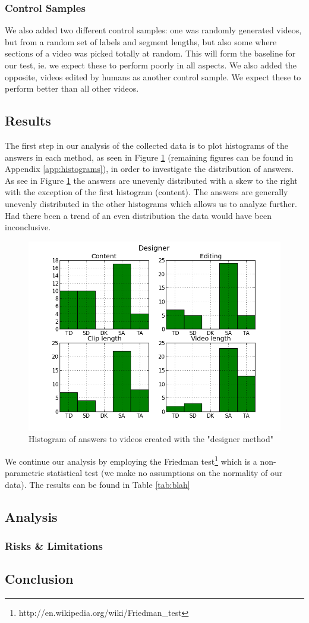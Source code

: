 \subsubsection{Control Samples}
%
We also added two different control samples: one was randomly generated videos, but from a random set of labels and segment lengths, but also some where sections of a video was picked totally at random.
%
%
This will form the baseline for our test, ie. we expect these to perform poorly in all aspects. We also added the opposite, videos edited by humans as another control sample. We expect these to perform better than all other videos.
%
\subsection{Results}
%
The first step in our analysis of the collected data is to plot histograms of the answers in each method, as seen in Figure \ref{fig:hist_design} (remaining figures can be found in Appendix \ref{app:histograms}), in order to investigate the distribution of answers. As see in Figure \ref{fig:hist_design} the answers are unevenly distributed with a skew to the right with the exception of the first histogram (content). The answers are generally unevenly distributed in the other histograms which allows us to analyze further. Had there been a trend of an even distribution the data would have been inconclusive.
%
\begin{figure}
     \centering
     \includegraphics[width=1.0\textwidth]{img/designer_barplot.png}
     \caption{Histogram of answers to videos created with the "designer method"}\label{fig:hist_design}
\end{figure}
%
We continue our analysis by employing the Friedman test\footnote{http://en.wikipedia.org/wiki/Friedman\_test} which is a non-parametric statistical test (we make no assumptions on the normality of our data). The results can be found in Table \ref{tab:blah}
%
\subsection{Analysis}
%

%
\subsubsection{Risks \& Limitations}
%


%
\subsection{Conclusion}
%